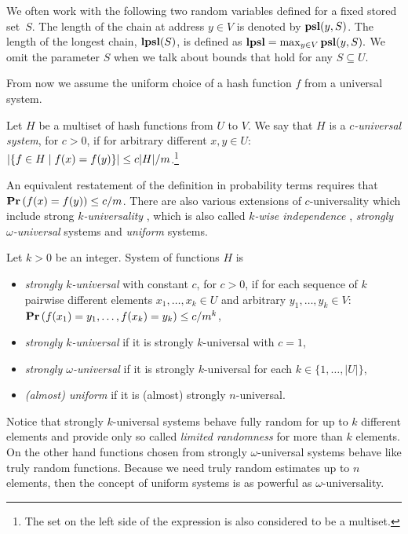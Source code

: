 We often work with the following two random variables defined for a fixed stored set~$S$. The length of the chain at address $y \in V$ is denoted by $\mathbf{psl}(y, S)$. The length of the longest chain, $\mathbf{lpsl}(S)$, is defined as $\mathbf{lpsl} = \max_{y \in V} \mathbf{psl}(y, S).$ We omit the parameter $S$ when we talk about bounds that hold for any $S \subseteq U$.

From now we assume the uniform choice of a hash function $f$ from a universal system.

\begin{definition}
\label{definition-c-universal-system}
Let $H$ be a multiset of hash functions from $U$ to $V$. We say that $H$ is a \emph{$c$-universal system}, for $c > 0$, if for arbitrary different $x, y \in U$: $\left|\lbrace f \in H \mid f(x) = f(y) \rbrace\right| \leq {c|H|}/{m}$.\footnote{The set on the left side of the expression is also considered to be a multiset.}
\end{definition}

An equivalent restatement of the definition in probability terms requires that $\mathbf{Pr}\left(f(x) = f(y)\right) \leq c/m$. There are also various extensions of $c$-universality which include strong \emph{$k$-universality} \cite{DBLP:conf/focs/WegmanC79}, which is also called \emph{$k$-wise independence} \cite{DBLP:conf/focs/WegmanC79}, \emph{strongly $\omega$-universal} \cite{DBLP:conf/focs/WegmanC79} systems and \emph{uniform} \cite{DBLP:journals/siamcomp/PaghP08} systems.
\begin{definition}
Let $k > 0$ be an integer. System of functions $H$ is
\begin{itemize}
	\item \emph{strongly $k$-universal} with constant $c$, for $c > 0$, if for each sequence of $k$ pairwise different elements $x_1, \dots, x_k \in U$ and arbitrary $y_1, \dots, y_k \in V$: $\mathbf{Pr}\left(f(x_1) = y_1, \dots, f(x_k) = y_k\right) \leq {c}/{m^k}$,
	\item \emph{strongly $k$-universal} if it is strongly $k$-universal with $c = 1$,
	\item \emph{strongly $\omega$-universal} if it is strongly $k$-universal for each $k \in \{1, \dots, |U|\}$,
	\item \emph{(almost) uniform} if it is (almost) strongly $n$-universal.
\end{itemize}
\end{definition}

Notice that strongly $k$-universal systems behave fully random for up to $k$ different elements and provide only so called \emph{limited randomness} for more than $k$ elements. On the other hand functions chosen from strongly $\omega$-universal systems behave like truly random functions. Because we need truly random estimates up to $n$ elements, then the concept of uniform systems is as powerful as $\omega$-universality.

